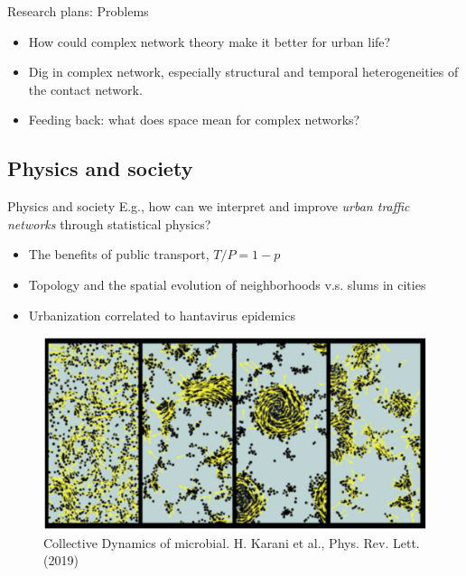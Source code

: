 \begin{frame}{Research plans: Problems}
    \begin{itemize}
        \item How could complex network theory make it better for urban life?
        \item Dig in complex network, especially structural and temporal heterogeneities of the contact network.
        \item Feeding back: what does space mean for complex networks?
    \end{itemize}
\end{frame}
\subsection{Physics and society}
\begin{frame}{Physics and society}
E.g., how can we interpret and improve \textit{urban traffic networks} through statistical physics?
    \begin{itemize}
        \item The benefits of public transport\cite{buchanan2019benefits}, $T/P = 1-p$
        \item Topology and the spatial evolution of neighborhoods v.s. slums in cities\cite{brelsford2018toward}
        \item Urbanization correlated to hantavirus epidemics
    \end{itemize}
    \begin{figure}
        \centering
        \includegraphics[width = 0.6\linewidth]{Pics/rwprl.png}
        \caption{Collective Dynamics of microbial. H. Karani et al., Phys. Rev. Lett. (2019)}
        \label{fig:rwprl}
    \end{figure}
\end{frame}

